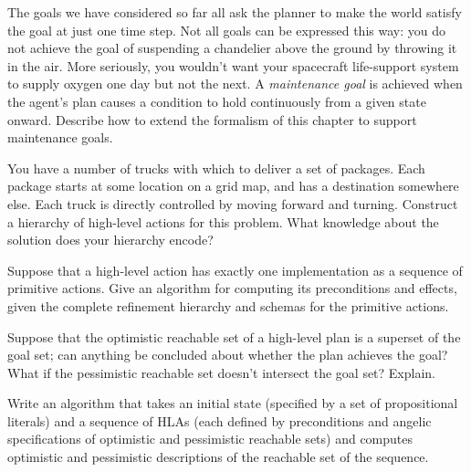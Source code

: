 
\begin{uexercise}
The goals we have considered so far all ask the planner to make the world
satisfy the goal at just one time step. Not all goals can be expressed this way: you
do not achieve the goal of suspending a chandelier above the ground by
throwing it in the air. More seriously, you wouldn't want your spacecraft
life-support system to supply oxygen one day but not the next.
A {\em maintenance goal} is achieved when the agent's plan causes a condition
to hold continuously from a given state onward.  Describe how to
extend the formalism of this chapter to support maintenance goals.
\end{uexercise} 



\begin{exercise}%
You have a number of trucks with which to deliver a set of packages.
Each package starts at some location on a grid map, and has a
destination somewhere else.  Each truck is directly controlled by
moving forward and turning.  Construct a hierarchy of high-level
actions for this problem.  What knowledge about the solution does your
hierarchy encode?
\end{exercise} 

\begin{exercise}
Suppose that a high-level action has exactly one implementation as a
sequence of primitive actions.  Give an algorithm for computing its
preconditions and effects, given the complete refinement hierarchy and
schemas for the primitive actions.
\end{exercise} 

\begin{exercise}
Suppose that the optimistic reachable set of a high-level plan is a
superset of the goal set; can anything be concluded about whether the
plan achieves the goal? What if the pessimistic reachable set doesn't
intersect the goal set? Explain.
\end{exercise} 

\begin{exercise}
Write an algorithm that takes an initial state (specified by a set of propositional literals) and a sequence of HLAs (each defined by preconditions and angelic specifications of optimistic and pessimistic reachable sets)
and computes optimistic and pessimistic descriptions of the reachable set of the sequence.
\end{exercise} 



